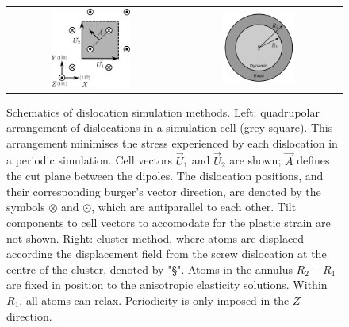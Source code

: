 \documentclass[a4paper,11pt]{article}
\begin{document}
        \begin{figure}
    \begin{tabular}{cc}
	     \includegraphics[width=0.5\textwidth]{Images/s_arrangement_quadrupole.png} &
             \includegraphics[width=0.45\textwidth]{Images/cluster_method_schematic.png}  \\
    \end{tabular}		
\caption{Schematics of dislocation simulation methods. Left: quadrupolar arrangement of dislocations in a simulation cell (grey square). This arrangement  minimises the stress experienced by each dislocation in a periodic simulation. Cell vectors $\vec{U}_1$ and $\vec{U}_2$ are shown; $\vec{A}$ defines the cut plane between the dipoles. The dislocation positions, and their corresponding burger's vector direction, are denoted by the symbols $\otimes$ and $\odot$, which are antiparallel to each other. Tilt components to cell vectors to accomodate for the plastic strain are not shown. Right: cluster method, where atoms are displaced according the displacement field from the screw dislocation at the centre of the cluster, denoted by "\S". Atoms in the annulus $R_2 - R_1$ are fixed in position to the anisotropic elasticity solutions. Within $R_1$, all atoms can relax. Periodicity is only imposed in the $Z$ direction.}
	\label{fig:dislocationschematics}
    \end{figure}
\end{document}
